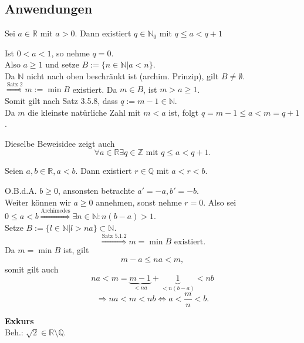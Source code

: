 \documentclass[../ana1.tex]{subfiles}
\begin{document}
\subsection{Anwendungen}
\begin{lem}
	Sei $a\in\mathbb{R}$ mit $a>0$. Dann existiert $q\in\mathbb{N}_0$ mit $q\leq a<q+1$
\end{lem}
\begin{bew}
	Ist $0<a<1$, so nehme $q = 0$.\\
	Also $a\geq 1$ und setze $B:=\{n\in\mathbb{N}|a<n\}$.\\
	Da $\mathbb{N}$ nicht nach oben beschränkt ist (archim. Prinzip), gilt $B\neq \emptyset$.\\
	$\overset{\text{Satz 2}}{\Rightarrow} m:=\min B$ existiert. Da $m\in B$, ist $m> a \geq 1$.\\
	Somit gilt nach Satz 3.5.8, dass $q:= m-1\in\mathbb{N}$.\\
	Da $m$ die kleinste natürliche Zahl mit $m<a$ ist, folgt $q = m-1 \leq a < m = q+1$.
\end{bew}
\begin{bem}
	Dieselbe Beweisidee zeigt auch $$\forall a\in\mathbb{R}\exists q\in\mathbb{Z} \text{ mit } q\leq a<q+1.$$
\end{bem}
\begin{satz}
	Seien $a,b\in\mathbb{R}, a<b$. Dann existiert $r\in\mathbb{Q}$ mit $a<r<b$.
\end{satz}
\begin{bew}
	O.B.d.A. $b\geq 0$, ansonsten betrachte $a'=-a, b'=-b$.\\
	Weiter können wir $a\geq 0$ annehmen, sonst nehme $r=0$.
	Also sei $0\leq a <b \overset{\text{Archimedes}}{\Rightarrow} \exists n\in\mathbb{N}: n(b-a)>1$.\\
	Setze $B:=\{l\in\mathbb{N}|l>na\} \subset \mathbb{N}$.
	$$\overset{\text{Satz 5.1.2}}{\Rightarrow} m = \min B \text{ existiert}.$$
	Da $m=\min B$ ist, gilt $$m -a\leq na<m,$$ somit gilt auch $$na<m=\underbrace{m-1}_{<na}+\underbrace{1}_{<n(b-a)}<nb$$
	$$\Rightarrow na<m<nb \Leftrightarrow a<\frac{m}{n}<b.$$
\end{bew}
\textbf{Exkurs}\\
Beh.: $\sqrt{2}\in\mathbb{R}\setminus \mathbb{Q}.$
\end{document}
